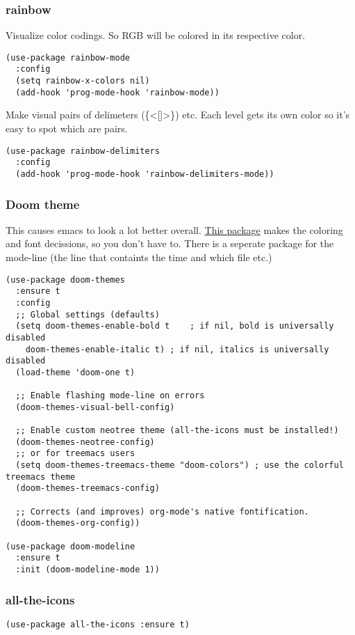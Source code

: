 \documentclass[11pt]{article}
\begin{document}
\subsubsection{rainbow}
\label{sec:org4848c5e}
Visualize color codings. So RGB will be colored in its respective color.
\begin{verbatim}
(use-package rainbow-mode
  :config
  (setq rainbow-x-colors nil)
  (add-hook 'prog-mode-hook 'rainbow-mode))
\end{verbatim}

Make visual pairs of delimeters (\{<[]>\}) etc. Each level gets its own color so it's easy to spot which are pairs.
\begin{verbatim}
(use-package rainbow-delimiters
  :config
  (add-hook 'prog-mode-hook 'rainbow-delimiters-mode))
\end{verbatim}
\subsubsection{Doom theme}
\label{sec:org2c54ca4}
This causes emacs to look a lot better overall. \href{https://github.com/hlissner/emacs-doom-themes}{This package} makes the coloring and font decissions, so you don't have to. There is a seperate package for the mode-line (the line that containts the time and which file etc.)
\begin{verbatim}
(use-package doom-themes
  :ensure t
  :config
  ;; Global settings (defaults)
  (setq doom-themes-enable-bold t    ; if nil, bold is universally disabled
	doom-themes-enable-italic t) ; if nil, italics is universally disabled
  (load-theme 'doom-one t)

  ;; Enable flashing mode-line on errors
  (doom-themes-visual-bell-config)

  ;; Enable custom neotree theme (all-the-icons must be installed!)
  (doom-themes-neotree-config)
  ;; or for treemacs users
  (setq doom-themes-treemacs-theme "doom-colors") ; use the colorful treemacs theme
  (doom-themes-treemacs-config)

  ;; Corrects (and improves) org-mode's native fontification.
  (doom-themes-org-config))

(use-package doom-modeline
  :ensure t
  :init (doom-modeline-mode 1))
\end{verbatim}
\subsubsection{all-the-icons}
\label{sec:org4255132}
\begin{verbatim}
(use-package all-the-icons :ensure t)
\end{verbatim}
\end{document}
